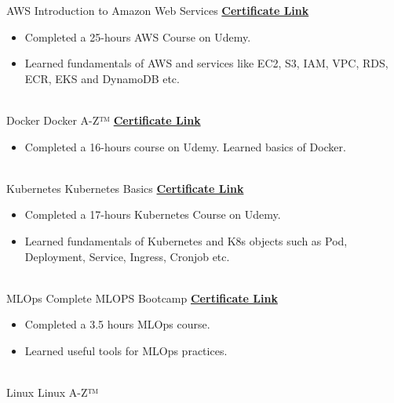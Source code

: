 \documentclass[letterpaper]{DS_class_file} %
\begin{document}
\begin{twenty} %
        \twentyitem
	{AWS}
	{}
	{\hspace{0.3cm}Introduction to Amazon Web Services}
	{\href{https://www.udemy.com/certificate/UC-8773cc22-c86d-43a9-89ad-4c4e8e02aa38/}{\textbf{Certificate Link}}}
	{}
	{
		{\begin{itemize}
				\item Completed a 25-hours AWS Course on Udemy.
				\item Learned fundamentals of AWS and services like EC2, S3, IAM, VPC, RDS, ECR, EKS and DynamoDB etc.
		\end{itemize}}
	}
	\\

	\twentyitem
	{Docker}
	{}
	{\hspace{0.3cm}Docker A-Z™}
	{\href{https://www.udemy.com/certificate/UC-c1ab98de-9803-452b-9166-8ef3ae797e5a/}{\textbf{Certificate Link}}}
	{}
	{
		{\begin{itemize}
				\item Completed a 16-hours course on Udemy. Learned basics of Docker.
		\end{itemize}}
	}
         \\
        \twentyitem
	{Kubernetes}
	{}
	{\hspace{0.3cm}Kubernetes Basics}
	{\href{https://www.udemy.com/certificate/UC-ffd4189d-0bd4-4cde-9845-bf7c5e5bbf22/}{\textbf{Certificate Link}}}
	{}
	{
		{\begin{itemize}
				\item Completed a 17-hours Kubernetes Course on Udemy.
                    \item Learned fundamentals of Kubernetes and K8s objects such as Pod, Deployment, Service, Ingress, Cronjob etc.
		\end{itemize}}
	}
	\\
	\twentyitem
	{MLOps}
	{}
	{\hspace{0.3cm}Complete MLOPS Bootcamp}
	{\href{https://www.udemy.com/certificate/UC-2296034a-bb96-4d35-80b5-dd956cceeeb7/}{\textbf{Certificate Link}}}
	{}
	{
		{\begin{itemize}
				\item Completed a 3.5 hours MLOps course.
                    \item Learned useful tools for MLOps practices.
		\end{itemize}}
	}
	\\
	\twentyitem
	{Linux}
	{}
	{\hspace{0.3cm}Linux A-Z™}

\end{twenty}
\end{document}
